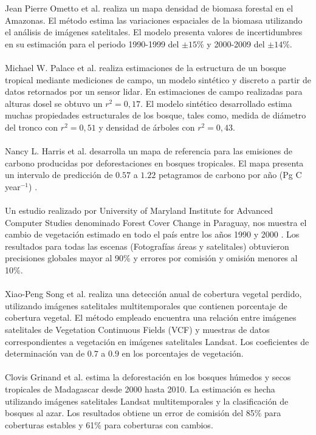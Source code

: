 Jean Pierre Ometto et al. \cite{ometto2015amazon} realiza un mapa densidad de biomasa forestal en el Amazonas. El m\'etodo estima las variaciones espaciales de la biomasa utilizando el an\'alisis de im\'agenes satelitales. El modelo presenta valores de incertidumbres en su estimaci\'on para el periodo 1990-1999 del $ \pm 15\% $ y 2000-2009 del $ \pm 14\% $.\\~\\
Michael W. Palace et al. \cite{palace2015estimating} realiza estimaciones de la estructura de un bosque tropical mediante mediciones de campo, un modelo sint\'etico y  discreto a partir de datos retornados por un sensor lidar. En estimaciones de campo realizadas para alturas dosel se obtuvo un $ r^{2}=0,17 $. El modelo sint\'etico desarrollado estima muchas propiedades estructurales de los bosque, tales como, medida de di\'ametro del tronco con $ r^{2}=0,51 $ y densidad de \'arboles con $ r^{2}=0,43 $.\\~\\
Nancy L. Harris et al. \cite{harris2012baseline} desarrolla un mapa de referencia para las emisiones de carbono producidas por deforestaciones en bosques tropicales. El mapa presenta un intervalo de predicci\'on de $ 0.57 $ a $ 1.22 $ petagramos de carbono por a\~{n}o (Pg C year$ ^{-1} $) .\\~\\
Un estudio realizado por University of Maryland Institute for Advanced Computer Studies denominado Forest Cover Change in Paraguay, nos muestra el cambio de vegetaci\'on estimado en todo el pa\'is entre los a\~{n}os 1990 y 2000 \cite{huang2009assessment}. Los resultados para todas las escenas (Fotograf\'ias \'areas y satelitales) obtuvieron precisiones globales mayor al 90\% y errores por comisi\'on y omisi\'on menores al 10\%.\\~\\
Xiao-Peng Song et al. \cite{song2014annual} realiza una detecci\'on anual de cobertura vegetal perdido, utilizando im\'agenes satelitales multitemporales que contienen porcentaje de cobertura vegetal. El m\'etodo empleado encuentra una relaci\'on entre im\'agenes satelitales de Vegetation Continuous Fields (VCF) y muestras de datos correspondientes a vegetaci\'on en im\'agenes satelitales Landsat. Los coeficientes de determinaci\'on van de $ 0.7 $ a $ 0.9 $ en los porcentajes de vegetaci\'on.\\~\\
Clovis Grinand et al. \cite{grinand2013estimating} estima la deforestaci\'on en los bosques húmedos y secos tropicales de Madagascar desde 2000 hasta 2010. La estimaci\'on es hecha utilizando im\'agenes satelitales Landsat multitemporales y la clasificaci\'on de bosques al azar. Los resultados obtiene un error de comisi\'on del 85\% para coberturas estables y 61\% para coberturas con cambios.\\~\\

